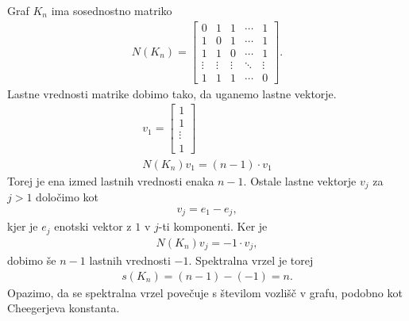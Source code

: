 \begin{primer}\label{polni-grafi-racun}
    Graf \(K_n\) ima sosednostno matriko
    \begin{align*}
        N(K_n) = \begin{bmatrix}
                     0      & 1      & 1      & \cdots & 1      \\
                     1      & 0      & 1      & \cdots & 1      \\
                     1      & 1      & 0      & \cdots & 1      \\
                     \vdots & \vdots & \vdots & \ddots & \vdots \\
                     1      & 1      & 1      & \cdots & 0
                 \end{bmatrix}.
    \end{align*}
    Lastne vrednosti matrike dobimo tako, da uganemo lastne vektorje.
    \begin{align*}
        v_1 = \begin{bmatrix}
                  1      \\
                  1      \\
                  \vdots \\
                  1
              \end{bmatrix} \\
        N(K_n) v_1 = (n-1) \cdot v_1
    \end{align*}
    Torej je ena izmed lastnih vrednosti enaka \(n-1\). Ostale lastne vektorje \(v_j\) za \(j>1\) določimo kot
    \begin{align*}
        v_j = e_1 - e_j,
    \end{align*}
    kjer je \(e_j\) enotski vektor z \(1\) v \(j\)-ti komponenti. Ker je
    \begin{align*}
        N(K_n)v_j = -1 \cdot v_j,
    \end{align*}
    dobimo še \(n-1\) lastnih vrednosti \(-1\). Spektralna vrzel je torej
    \begin{align*}
        s(K_n) = (n-1) - (-1) = n.
    \end{align*}
    Opazimo, da se spektralna vrzel povečuje s številom vozlišč v grafu, podobno kot Cheegerjeva konstanta.
\end{primer}
